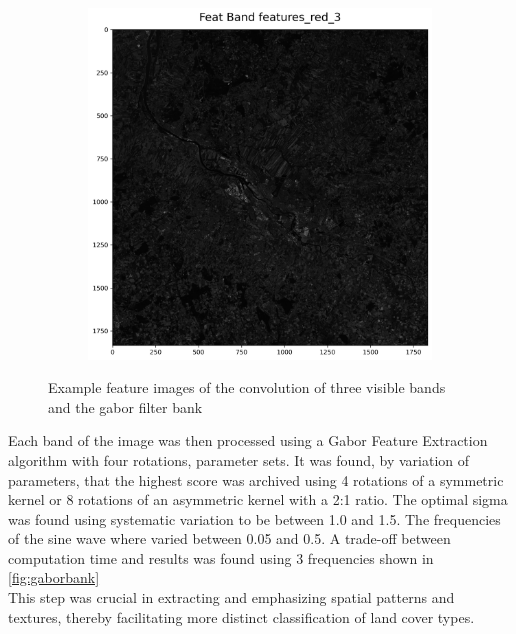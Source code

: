 \documentclass[12pt,a4paper, english]{article}
\begin{document}
\begin{figure}[!htbp]
\begin{subfigure}[b]{0.3\textwidth}
      \end{subfigure}
      \begin{subfigure}[b]{0.3\textwidth}
        \includegraphics[width=\textwidth]{img/Features_red2.png}
      \end{subfigure}
     \caption{Example feature images of the convolution of three visible bands and the gabor filter bank\label{fig:gaborresults}}
    \end{figure}
 \noindent 
      Each band of the image was then processed using a Gabor Feature Extraction algorithm with four rotations, parameter sets. 
      It was found, by variation of parameters, that the highest score was archived using 4 rotations of a symmetric kernel or 8 rotations of an asymmetric kernel with a 2:1 ratio.
      The optimal sigma was found using systematic variation to be between 1.0 and 1.5. 
      The frequencies of the sine wave where varied between 0.05 and 0.5. A trade-off between computation time and results was found using 3 frequencies shown in \cref{fig:gaborbank} \\ 
      This step was crucial in extracting and emphasizing spatial patterns and textures, thereby facilitating more distinct classification of land cover types. 
\end{document}
